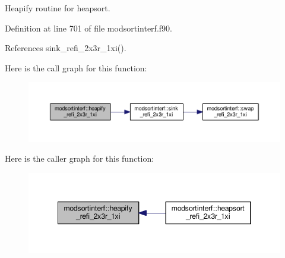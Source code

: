 Heapify routine for heapsort. 



Definition at line 701 of file modsortinterf.\-f90.



References sink\-\_\-refi\-\_\-2x3r\-\_\-1xi().



Here is the call graph for this function\-:\nopagebreak
\begin{figure}[H]
\begin{center}
\leavevmode
\includegraphics[width=350pt]{classmodsortinterf_acb9c4af70266d13a8738766f5b52bab7_cgraph}
\end{center}
\end{figure}




Here is the caller graph for this function\-:\nopagebreak
\begin{figure}[H]
\begin{center}
\leavevmode
\includegraphics[width=346pt]{classmodsortinterf_acb9c4af70266d13a8738766f5b52bab7_icgraph}
\end{center}
\end{figure}



